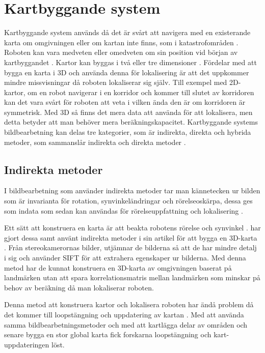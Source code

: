 \section{Kartbyggande system}

Kartbyggande system används då det är svårt att navigera med en existerande karta om omgivningen eller om kartan inte finns, som i katastrofområden \citep{geospatial}. Roboten kan vara medveten eller omedveten om sin position vid början av kartbyggandet \citep{globalsubmaps}. Kartor kan byggas i två eller tre dimensioner \citep{ProbabilisticRobotics}. Fördelar med att bygga en karta i 3D och använda denna för lokalisering är att det uppkommer mindre missvisningar då roboten lokaliserar sig själv. Till exempel med 2D-kartor, om en robot navigerar i en korridor och kommer till slutet av korridoren kan det vara svårt för roboten att veta i vilken ända den är om korridoren är symmetrisk. Med 3D så finns det mera data att använda för att lokalisera, men detta betyder att man behöver mera beräkningskapacitet. Kartbyggande systems bildbearbetning kan delas tre kategorier, som är indirekta, direkta och hybrida metoder, som sammanslår indirekta och direkta metoder \citep{geospatial}.

\subsection{Indirekta metoder}

I bildbearbetning som använder indirekta metoder tar man kännetecken ur bilden som är invarianta för rotation, synvinkeländringar och rörelseoskärpa, dessa ges som indata som sedan kan användas för rörelseuppfattning och lokalisering \citep{geospatial}. 

Ett sätt att konstruera en karta är att beakta robotens rörelse och synvinkel \citep{globalsubmaps}. \cite{mapbuildingsift} har gjort dessa samt använt indirekta metoder i sin artikel  för att bygga en 3D-karta \citep{mapbuildingsift}. Från stereokamerornas bilder, utjämnar de bilderna så att de har mindre detalj i sig och använder SIFT för att extrahera egenskaper ur bilderna. Med denna metod har de kunnat konstruera en 3D-karta av omgivningen baserat på landmärken utan att spara korrelationsmatris mellan landmärken som minskar på behov av beräkning då man lokaliserar roboten. 

Denna metod att konstruera kartor och lokalisera roboten har ändå problem då det kommer till loopstängning och uppdatering av kartan \citep{globalsubmaps}. Med att använda samma bildbearbetningsmetoder och med att kartlägga delar av områden och senare bygga en stor global karta fick forskarna loopstängning och kart-uppdateringen löst. 

